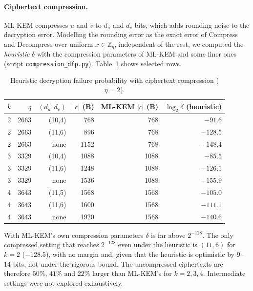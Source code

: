 \documentclass[11pt]{article}
\theoremstyle{remark}
\newcommand{\Z}{\mathbb{Z}}
\begin{document}
\paragraph{Ciphertext compression.} ML-KEM compresses $u$ and $v$ to $d_u$ and $d_v$ bits, which adds rounding noise to the decryption error. Modelling the rounding error as the exact error of Compress and Decompress over uniform $x\in\Z_q$, independent of the rest, we computed the \emph{heuristic} $\delta$ with the compression parameters of ML-KEM and some finer ones (script \texttt{compression\_\allowbreak dfp.py}). Table~\ref{tab:comp} shows selected rows.
\begin{table}[h]\centering\small\setlength{\tabcolsep}{4pt}
\begin{tabular}{rrrrrr}\toprule
$k$ & $q$ & $(d_u,d_v)$ & $|c|$ (B) & ML-KEM $|c|$ (B) & $\log_2\delta$ (heuristic)\\\midrule
2 & 2663 & (10,4) & 768 & 768 & $-91.6$\\
2 & 2663 & (11,6) & 896 & 768 & $-128.5$\\
2 & 2663 & none & 1152 & 768 & $-148.4$\\\midrule
3 & 3329 & (10,4) & 1088 & 1088 & $-85.5$\\
3 & 3329 & (11,6) & 1248 & 1088 & $-126.1$\\
3 & 3329 & none & 1536 & 1088 & $-155.9$\\\midrule
4 & 3643 & (11,5) & 1568 & 1568 & $-105.0$\\
4 & 3643 & (11,6) & 1600 & 1568 & $-111.1$\\
4 & 3643 & none & 1920 & 1568 & $-140.6$\\\bottomrule
\end{tabular}
\caption{Heuristic decryption failure probability with ciphertext compression ($\eta=2$).}\label{tab:comp}
\end{table}
With ML-KEM's own compression parameters $\delta$ is far above $2^{-128}$. The only compressed setting that reaches $2^{-128}$ even under the heuristic is $(11,6)$ for $k=2$ ($-128.5$), with no margin and, given that the heuristic is optimistic by $9$--$14$ bits, not under the rigorous bound. The uncompressed ciphertexts are therefore $50\%$, $41\%$ and $22\%$ larger than ML-KEM's for $k=2,3,4$. Intermediate settings were not explored exhaustively.
\end{document}
